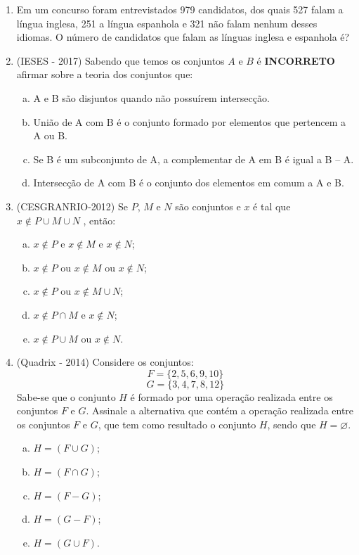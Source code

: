 \begin{enumerate}
 
 \item Em um concurso foram entrevistados 979 candidatos, dos quais 527 falam a língua inglesa, 251 a língua espanhola e 321 não falam nenhum desses idiomas. O número de candidatos que falam as línguas inglesa e espanhola é? 




  \item (IESES - 2017)  Sabendo que temos os conjuntos $A$ e $B$ é \textbf{INCORRETO} afirmar sobre a teoria dos conjuntos que:
  \begin{enumerate}[a)]
  \item A e B são disjuntos quando não possuírem intersecção.
  \item União de A com B é o conjunto formado por elementos que pertencem a A ou B.
  \item Se B é um subconjunto de A, a complementar de A em B é igual a B – A.
  \item Intersecção de A com B é o conjunto dos elementos em comum a A e B.
  \end{enumerate}
  
  \item (CESGRANRIO-2012) Se $P$, $M$ e $N$ são conjuntos e $x$ é tal que $x \notin P \cup M \cup N$ , então:
  \begin{enumerate}[a)]
  \item $x \notin P$  e $x  \notin M$  e $x \notin N$;
  \item $x \notin P$ ou $x \notin M$ ou $x \notin N$;
  \item $x \notin P$ ou $x \notin M \cup N$;
  \item $x \notin P \cap M$ e $x \notin N$;
  \item $x \notin P \cup M$ ou $x \notin N$.
  \end{enumerate}
  
  \item (Quadrix - 2014)  Considere os conjuntos: 
      \[F = \{2, 5, 6, 9,10 \}\]
      \[G = \{3, 4, 7, 8, 12\}\]
 Sabe-se que o conjunto $H$ é formado por uma operação realizada entre os conjuntos $F$ e $G$. Assinale a alternativa que  contém a operação realizada entre os conjuntos $F$ e $G$, que tem como resultado o conjunto $H$, sendo que $H = \varnothing$.
 \begin{enumerate}[a)]
  \item $H= (F \cup G)$;
  \item $H= (F \cap G)$;
  \item $H= (F - G)$;
  \item $H= (G - F)$;
  \item $H= (G \cup F)$.
 \end{enumerate}
  
  \end{enumerate}
  
